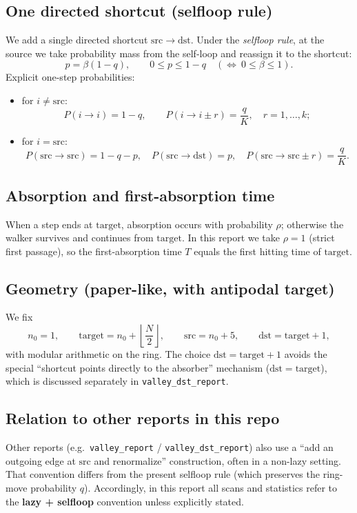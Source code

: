 \documentclass[11pt]{article}
\begin{document}
\subsection{One directed shortcut (selfloop rule)}
We add a single directed shortcut $\mathrm{src}\to \mathrm{dst}$.
Under the \emph{selfloop rule}, at the source we take probability mass from the self-loop and reassign it to the shortcut:
\[
p=\beta(1-q),\qquad 0\le p\le 1-q\quad(\Leftrightarrow\ 0\le \beta\le 1).
\]
Explicit one-step probabilities:
\begin{itemize}
  \item for $i\neq \mathrm{src}$:
  \[
  P(i\to i)=1-q,\qquad P(i\to i\pm r)=\frac{q}{K},\quad r=1,\dots,k;
  \]
  \item for $i=\mathrm{src}$:
  \[
  P(\mathrm{src}\to\mathrm{src})=1-q-p,\quad
  P(\mathrm{src}\to\mathrm{dst})=p,\quad
  P(\mathrm{src}\to\mathrm{src}\pm r)=\frac{q}{K}.
  \]
\end{itemize}

\subsection{Absorption and first-absorption time}
When a step ends at $\mathrm{target}$, absorption occurs with probability $\rho$; otherwise the walker survives and continues from $\mathrm{target}$.
In this report we take $\rho=1$ (strict first passage), so the first-absorption time $T$ equals the first hitting time of $\mathrm{target}$.

\subsection{Geometry (paper-like, with antipodal target)}
We fix
\[
n_0=1,\qquad
\mathrm{target}=n_0+\left\lfloor\frac{N}{2}\right\rfloor,\qquad
\mathrm{src}=n_0+5,\qquad
\mathrm{dst}=\mathrm{target}+1,
\]
with modular arithmetic on the ring.
The choice $\mathrm{dst}=\mathrm{target}+1$ avoids the special ``shortcut points directly to the absorber'' mechanism ($\mathrm{dst}=\mathrm{target}$), which is discussed separately in \texttt{valley\_dst\_report}.

\subsection{Relation to other reports in this repo}
Other reports (e.g.\ \texttt{valley\_report} / \texttt{valley\_dst\_report}) also use a ``add an outgoing edge at $\mathrm{src}$ and renormalize'' construction, often in a non-lazy setting.
That convention differs from the present selfloop rule (which preserves the ring-move probability $q$).
Accordingly, in this report all scans and statistics refer to the \textbf{lazy + selfloop} convention unless explicitly stated.
\end{document}
